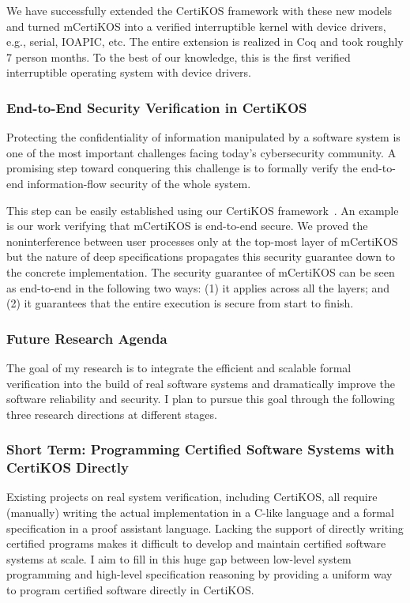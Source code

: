 \documentclass[a4paper, 10pt]{article}
\begin{document}
\begin{small}
We have successfully extended the CertiKOS framework with these new models
and turned mCertiKOS
into a verified interruptible kernel with device
drivers, e.g., serial, IOAPIC, etc. 
The entire extension is realized in Coq and took roughly 7 person months.
To the best of our knowledge, this is the first verified
interruptible operating system with device drivers.

\subsubsection*{\small End-to-End Security Verification in CertiKOS}
Protecting the confidentiality of information manipulated by
a software system is one of the most important challenges
facing today’s cybersecurity community. A promising step
toward conquering this challenge is to formally verify  the
end-to-end information-flow
security of the whole system. 

This step can be easily established
using our CertiKOS framework~\cite{pldi16-security}. An example is our work verifying
that mCertiKOS is end-to-end secure. We proved the noninterference between user processes 
only at the top-most layer of mCertiKOS but the nature of deep specifications propagates
this security guarantee down to the concrete implementation.
The security guarantee of mCertiKOS
can be seen as end-to-end in the following two ways: (1)
it applies across all the layers; and (2) it guarantees that the entire
execution is secure from start to finish.

\subsubsection*{\large Future Research Agenda}
The goal of my research is to
integrate the efficient and scalable formal verification
into the build of real software systems
and dramatically improve the software reliability and security. 
I plan to pursue this goal through the following three research directions at different stages.


\subsubsection*{\small Short Term: Programming Certified Software Systems with CertiKOS Directly}
Existing  projects on real system verification,
including CertiKOS, all require   (manually)  writing the actual implementation
 in a C-like language and a formal specification in a proof assistant language.
Lacking the support of directly writing certified  programs  makes it difficult to develop and maintain certified  software systems
at scale. I aim to fill in this huge gap between low-level system programming and high-level specification reasoning
by
providing
a uniform way to program certified software directly in CertiKOS.


\end{small}
\end{document}
